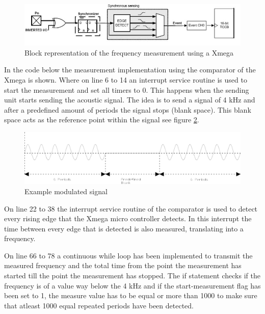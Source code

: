 \documentclass[10pt,a4paper]{article}
\begin{document}
\begin{figure}[H]
   \centering
   \includegraphics[width=\textwidth]{freqblockcount.jpg}
   \caption{Block representation of the frequency measurement using a Xmega \cite{avrfrequency}}
   \label{fig:freqblockcount}
\end{figure}

In the code below the measurement implementation using the comparator of the Xmega is shown. Where on line 6 to 14 an interrupt service routine is used to start the measurement and set all timers to 0. This happens when the sending unit starts sending the acoustic signal. The idea is to send a signal of 4 kHz and after a predefined amount of periods the signal stops (blank space). This blank space acts as the reference point within the signal see figure \ref{fig:acsignal}.

\begin{figure}[H]
   \centering
   \includegraphics[width=\textwidth]{acsignal.pdf}
   \caption{Example modulated signal}
   \label{fig:acsignal}
\end{figure}


On line 22 to 38 the interrupt service routine of the comparator is used to detect every rising edge that the Xmega micro controller detects. In this interrupt the time between every edge that is detected is also measured, translating into a frequency.

On line 66 to 78 a continuous while loop has been implemented to transmit the measured frequency and the total time from the point the measurement has started till the point the measurement has stopped. The if statement checks if the frequency is of a value way below the 4 kHz and if the start-measurement flag has been set to 1, the measure value has to be equal or more than 1000 to make sure that atleast 1000 equal repeated periods have been detected.
\newpage
\end{document}
